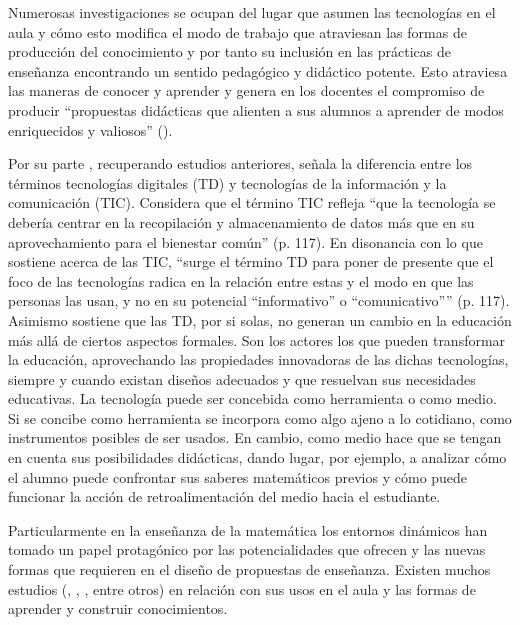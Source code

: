 \documentclass[oneside,spanish]{amsart}
\numberwithin{equation}{section}
\numberwithin{figure}{section}
\theoremstyle{definition}
\begin{document}
Numerosas investigaciones se ocupan del lugar que asumen las tecnologías en el aula y cómo esto modifica el modo de trabajo que atraviesan las formas de producción del conocimiento y por tanto su inclusión en las prácticas de enseñanza encontrando un sentido pedagógico y didáctico potente. Esto atraviesa las maneras de conocer y aprender y genera en los docentes el compromiso de producir “propuestas didácticas que alienten a sus alumnos a aprender de modos enriquecidos y valiosos” (\citet[p. 14]{maggio12}).

Por su parte \citet{palmas18}, recuperando estudios anteriores, señala la diferencia entre los términos tecnologías digitales (TD) y tecnologías de la información y la comunicación (TIC). Considera que el término TIC refleja “que la tecnología se debería centrar en la recopilación y almacenamiento de datos más que en su aprovechamiento para el bienestar común” (p. 117). En disonancia con lo que sostiene acerca de las TIC, “surge el término TD para poner de presente que el foco de las tecnologías radica en la relación entre estas y el modo en que las personas las usan, y no en su potencial “informativo” o “comunicativo”” (p. 117). Asimismo sostiene que las TD, por si solas, no generan un cambio en la educación más allá de ciertos aspectos formales. Son los actores los que pueden transformar la educación, aprovechando las propiedades innovadoras de las dichas tecnologías, siempre y cuando existan diseños adecuados y que resuelvan sus necesidades educativas. La tecnología puede ser concebida como herramienta o como medio. Si se concibe como herramienta se incorpora como algo ajeno a lo cotidiano, como instrumentos posibles de ser usados. En cambio, como medio hace que se tengan en cuenta sus posibilidades didácticas, dando lugar, por ejemplo, a analizar cómo el alumno puede confrontar sus saberes matemáticos previos y cómo puede funcionar la acción de retroalimentación del medio hacia el estudiante.

Particularmente en la enseñanza de la matemática los entornos dinámicos han tomado un papel protagónico por las potencialidades que ofrecen y las nuevas formas que requieren en el diseño de propuestas de enseñanza. Existen muchos estudios (\citet{arcavi08}, \citet{laborde15}, \citet{shahmohammadi19}, entre otros) en relación con sus usos en el aula y las formas de aprender y construir conocimientos. 
\end{document}
